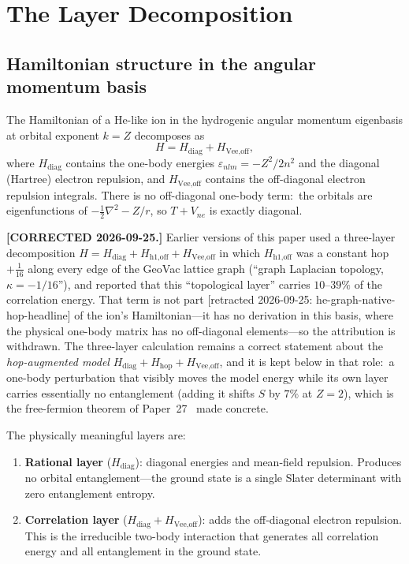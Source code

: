 \documentclass[twocolumn,pra,amsmath,amssymb,superscriptaddress]{revtex4-2}
\begin{document}
\section{The Layer Decomposition}
\label{sec:threelayer}

\subsection{Hamiltonian structure in the angular momentum basis}

The Hamiltonian of a He-like ion in the hydrogenic angular momentum
eigenbasis at orbital exponent $k = Z$ decomposes as
\begin{equation}
  H = H_{\text{diag}} + H_{\text{Vee,off}},
  \label{eq:decomposition}
\end{equation}
where $H_{\text{diag}}$ contains the one-body energies
$\varepsilon_{nlm} = -Z^2/2n^2$ and the diagonal (Hartree) electron
repulsion, and $H_{\text{Vee,off}}$ contains the off-diagonal electron
repulsion integrals.  There is no off-diagonal one-body term:\ the
orbitals are eigenfunctions of $-\tfrac12\nabla^2 - Z/r$, so
$T + V_{ne}$ is exactly diagonal.

\textbf{[CORRECTED 2026-09-25.]}  Earlier versions of this paper used
a three-layer decomposition
$H = H_{\text{diag}} + H_{\text{h1,off}} + H_{\text{Vee,off}}$ in which
$H_{\text{h1,off}}$ was a constant hop $+\tfrac{1}{16}$ along every
edge of the GeoVac lattice graph (``graph Laplacian topology,
$\kappa = -1/16$''), and reported that this ``topological layer''
carries $10$--$39\%$ of the correlation energy.  That term is not part [retracted 2026-09-25: he-graph-native-hop-headline]
of the ion's Hamiltonian---it has no derivation in this basis, where the
physical one-body matrix has no off-diagonal elements---so the
attribution is withdrawn.  The three-layer calculation remains a
correct statement about the \emph{hop-augmented model}
$H_{\text{diag}} + H_{\text{hop}} + H_{\text{Vee,off}}$, and it is kept
below in that role:\ a one-body perturbation that visibly moves the
model energy while its own layer carries essentially no entanglement
(adding it shifts $S$ by $7\%$ at $Z=2$), which is the
free-fermion theorem of Paper~27~\cite{GeoVac_Paper27} made concrete.

The physically meaningful layers are:
\begin{enumerate}
\item \textbf{Rational layer} ($H_{\text{diag}}$): diagonal
  energies and mean-field repulsion.  Produces no orbital
  entanglement---the ground state is a single Slater determinant
  with zero entanglement entropy.
\item \textbf{Correlation layer} ($H_{\text{diag}} +
  H_{\text{Vee,off}}$): adds the off-diagonal
  electron repulsion.  This is the irreducible two-body interaction
  that generates all correlation energy and all entanglement in the
  ground state.
\end{enumerate}
\end{document}
